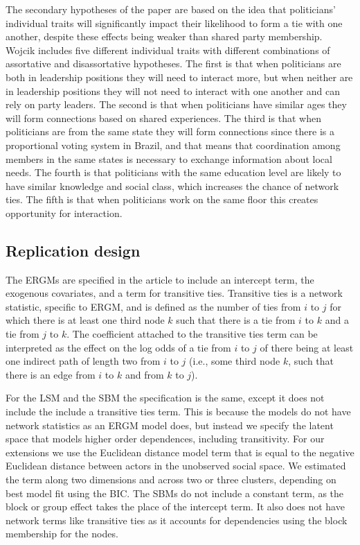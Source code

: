 \documentclass[fleqn,12pt]{wlscirep}
\begin{document}
The secondary hypotheses of the paper are based on the idea that politicians' individual traits will significantly impact their likelihood to form a tie with one another, despite these effects being weaker than shared party membership. Wojcik includes five different individual traits with different combinations of assortative and disassortative hypotheses. The first is that when politicians are both in leadership positions they will need to interact more, but when neither are in leadership positions they will not need to interact with one another and can rely on party leaders. The second is that when politicians have similar ages they will form connections based on shared experiences.  The third is that when politicians are from the same state they will form connections since there is a proportional voting system in Brazil, and that means that coordination among members in the same states is necessary to exchange information about local needs. The fourth is that politicians with the same education level are likely to have similar knowledge and social class, which increases the chance of network ties. The fifth is that when politicians work on the same floor this creates opportunity for interaction.


\subsection{Replication design}

The ERGMs are specified in the article to include an intercept term, the exogenous covariates, and a term for transitive ties. Transitive ties is a network statistic, specific to ERGM, and is defined as the number of ties from $i$ to $j$ for which there is at least one third node $k$ such that there is a tie from $i$ to $k$ and a tie from $j$ to $k$. The coefficient attached to the transitive ties term can be interpreted as the effect on the log odds of a tie from $i$ to $j$ of there being at least one indirect path of length two from $i$ to $j$ (i.e., some third node $k$, such that there is an edge from $i$ to $k$ and from $k$ to $j$).
 

For the LSM and the SBM the specification is the same, except it does not include the include a transitive ties term. This is because the models do not have network statistics as an ERGM model does, but instead we specify the latent space that models higher order dependences, including transitivity. For our extensions we use the Euclidean distance model term that is equal to the negative Euclidean distance between actors in the unobserved social space. We estimated the term along two dimensions and across two or three clusters, depending on best model fit using the BIC. The SBMs do not include a constant term, as the block or group effect takes the place of the intercept term. It also does not have network terms like transitive ties as it accounts for dependencies using the block membership for the nodes. 
\end{document}
